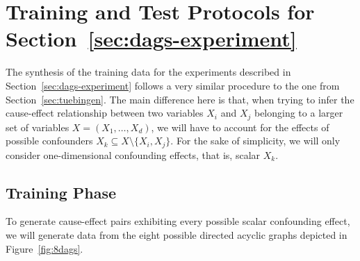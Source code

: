 \documentclass{article}
\begin{document}
\clearpage
\section{Training and Test Protocols for Section~\ref{sec:dags-experiment}}\label{sec:dagtrain}

The synthesis of the training data for the experiments described in
Section~\ref{sec:dags-experiment} follows a very similar procedure to the one from
Section~\ref{sec:tuebingen}. The main difference here is that, when trying to
infer the cause-effect relationship between two variables $X_i$ and $X_j$ belonging to a larger set of variables $X = (X_1, \ldots, X_d)$, we
will have to account for the effects of possible confounders $X_k \subseteq X \setminus \{X_i,X_j\}$.
For the sake of simplicity, we will only consider one-dimensional confounding
effects, that is, scalar $X_k$.

\subsection{Training Phase}

To generate cause-effect pairs exhibiting every possible scalar confounding
effect, we will generate data from the eight possible directed acyclic graphs
depicted in Figure~\ref{fig:8dags}.
\end{document}
